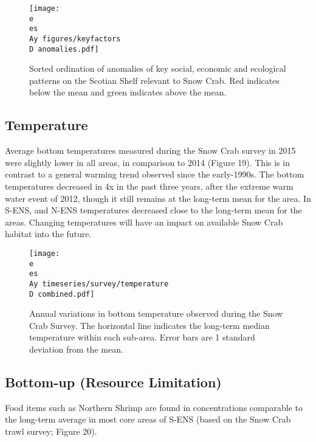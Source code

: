 \documentclass[paper=a4, fontsize=11pt]{article}
\newcommand{\D}{.}
\newcommand{\e}{/home/michelle/ecomod_data/}
\newcommand{\es}{snowcrab/}
\newcommand{\Ay}{assessments/2015/}
\begin{document}
\begin{figure}
  \centering
  \texttt{[image: \\e \\es \\Ay figures/keyfactors\\D anomalies.pdf]}
  \caption{Sorted ordination of anomalies of key social, economic and ecological patterns on the Scotian Shelf relevant to Snow Crab. Red indicates below the mean and green indicates above the mean.}
\end{figure}
\clearpage

\subsection{Temperature}
Average bottom temperatures measured during the Snow Crab survey in 2015 were slightly lower in all areas, in comparison to 2014 (Figure 19). This is in contrast to a general warming trend observed since the early-1990s. The bottom temperatures decreased in 4x in the past three years, after the extreme warm water event of 2012, though it still remains at the long-term mean for the area. In S-ENS, and N-ENS temperatures decreased close to the long-term mean for the areas. Changing temperatures will have an impact on available Snow Crab habitat into the future. 


\begin{figure}[h]
    \centering
    \texttt{[image: \\e \\es \\Ay timeseries/survey/temperature\\D combined.pdf]}
    \caption{Annual variations in bottom temperature observed during the Snow Crab Survey. The horizontal line indicates the long-term median temperature within each sub-area. Error bars are 1 standard deviation from the mean.}
\end{figure}

\subsection{Bottom-up (Resource Limitation)}

Food items such as Northern Shrimp are found in concentrations comparable to the long-term average in most core areas of S-ENS (based on the Snow Crab trawl survey; Figure 20).
\end{document}
